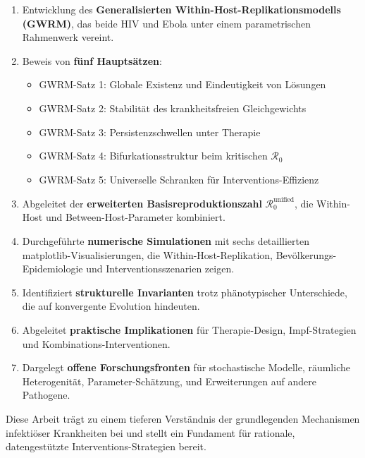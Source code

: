 ﻿\documentclass[a4paper,12pt]{article}
\theoremstyle{definition}
\begin{document}
\begin{enumerate}
\item Entwicklung des \textbf{Generalisierten Within-Host-Replikationsmodells (GWRM)}, das beide HIV und Ebola unter einem parametrischen Rahmenwerk vereint.

\item Beweis von \textbf{fünf Hauptsätzen}:
\begin{itemize}
\item GWRM-Satz 1: Globale Existenz und Eindeutigkeit von Lösungen
\item GWRM-Satz 2: Stabilität des krankheitsfreien Gleichgewichts
\item GWRM-Satz 3: Persistenzschwellen unter Therapie
\item GWRM-Satz 4: Bifurkationsstruktur beim kritischen $\mathcal{R}_0$
\item GWRM-Satz 5: Universelle Schranken für Interventions-Effizienz
\end{itemize}

\item Abgeleitet der \textbf{erweiterten Basisreproduktionszahl} $\mathcal{R}_0^{\text{unified}}$, die Within-Host und Between-Host-Parameter kombiniert.

\item Durchgeführte \textbf{numerische Simulationen} mit sechs detaillierten matplotlib-Visualisierungen, die Within-Host-Replikation, Bevölkerungs-Epidemiologie und Interventionsszenarien zeigen.

\item Identifiziert \textbf{strukturelle Invarianten} trotz phänotypischer Unterschiede, die auf konvergente Evolution hindeuten.

\item Abgeleitet \textbf{praktische Implikationen} für Therapie-Design, Impf-Strategien und Kombinations-Interventionen.

\item Dargelegt \textbf{offene Forschungsfronten} für stochastische Modelle, räumliche Heterogenität, Parameter-Schätzung, und Erweiterungen auf andere Pathogene.

\end{enumerate}

Diese Arbeit trägt zu einem tieferen Verständnis der grundlegenden Mechanismen infektiöser Krankheiten bei und stellt ein Fundament für rationale, datengestützte Interventions-Strategien bereit.

\newpage
\end{document}

